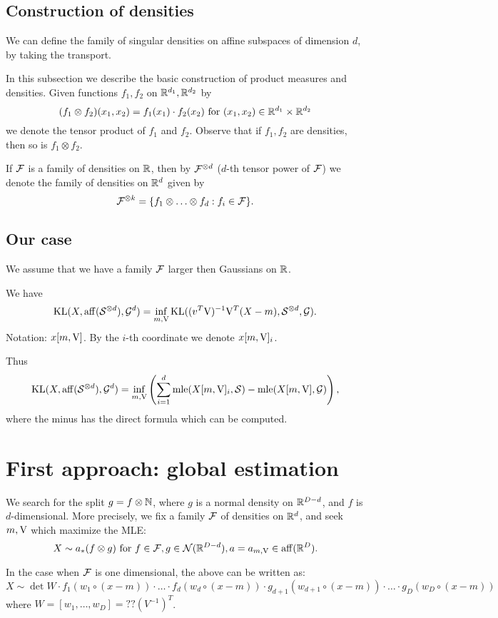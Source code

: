\subsection{Construction of densities}

We can define the family of singular densities on affine subspaces of 
dimension $d$, by taking the transport.


In this subsection we describe the basic construction of product measures and densities. Given functions $f_1,f_2$ on $\mathbb{R}^{d_1},\mathbb{R}^{d_2}$ by 
$$
(f_1 \otimes f_2)(x_1,x_2)=f_1(x_1) \cdot f_2(x_2) \mbox{ for } (x_1,x_2) \in \mathbb{R}^{d_1} 
\times \mathbb{R}^{d_2}
$$ 
we denote the tensor
product of $f_1$ and $f_2$. Observe that if $f_1,f_2$ are densities, then so is
$f_1 \otimes f_2$.

If $\mathcal{F}$ is a family of densities on $\mathbb{R}$, then by $\mathcal{F}^{\otimes d}$ ($d$-th tensor power of $\mathcal{F}$) we denote
the family of densities on $\mathbb{R}^d$ given by
$$
\mathcal{F}^{\otimes k}=\{f_1 \otimes \ldots \otimes f_d : f_i \in \mathcal{F}\}.
$$




\subsection{Our case}

We assume that we have a family $\mathcal{F}$ larger then Gaussians on $\mathbb{R}$.

We have
$$
\mathrm{KL}(X,\mathrm{aff}(\mathcal{S}^{\otimes d}),\mathcal{G}^d)=\inf_{m,\mathrm{V}} \mathrm{KL}((v^T\mathrm{V})^{-1}\mathrm{V}^T(X-m),\mathcal{S}^{\otimes d},\mathcal{G}).
$$
Notation: $x[m,\mathrm{V}]$. By the $i$-th coordinate we denote $x[m,\mathrm{V}]_i$.

Thus 
$$
\mathrm{KL}(X,\mathrm{aff}(\mathcal{S}^{\otimes d}),\mathcal{G}^d)=\inf_{m,\mathrm{V}} \left( \sum_{i=1}^d \mathrm{mle}(X[m,\mathrm{V}]_i,\mathcal{S})
-\mathrm{mle}(X[m,\mathrm{V}],\mathcal{G})
\right),
$$
where the minus has the direct formula which can be computed.


\section{First approach: global estimation}

We search for the split $g=f \otimes \mathbb{N}$, where $g$ is a normal density on $\mathbb{R}^{D-d}$,
and $f$ is $d$-dimensional. More precisely, we fix a family $\mathcal{F}$ of densities on $\mathbb{R}^d$, and seek $m,\mathrm{V}$ which maximize the MLE:
$$
X \sim a_*(f \otimes g) \text{ for } f \in \mathcal{F}, g \in \mathcal{N}(\mathbb{R}^{D-d}), a=a_{m,\mathrm{V}} \in \mathrm{aff}(\mathbb{R}^D). 
$$

In the case when $\mathcal{F}$ is one dimensional, the above can be written as:
$$
X \sim \det W \cdot f_1(w_1 \circ (x-m)) \cdot \ldots \cdot f_d(w_d \circ (x-m))
\cdot g_{d+1}(w_{d+1} \circ (x-m)) \cdot \ldots \cdot g_D(w_D \circ (x-m))
$$
where $W=[w_1,\ldots,w_D]=??(V^{-1})^T$.

